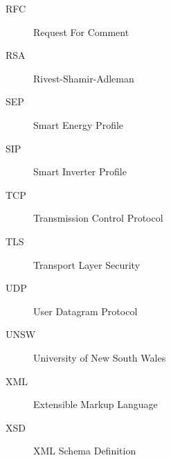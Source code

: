 \begin{description}
\item[RFC] Request For Comment 
\item[RSA] Rivest-Shamir-Adleman
\item[SEP] Smart Energy Profile
\item[SIP] Smart Inverter Profile
\item[TCP] Transmission Control Protocol
\item[TLS] Transport Layer Security
\item[UDP] User Datagram Protocol
\item[UNSW] University of New South Wales
\item[XML] Extensible Markup Language
\item[XSD] XML Schema Definition
\end{description}